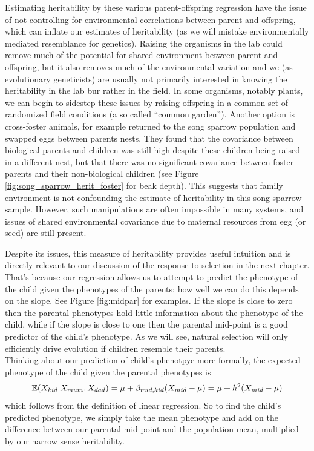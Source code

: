 Estimating heritability by these various parent-offspring regression have the issue of not controlling for
environmental correlations between parent and offspring, which can
inflate our estimates of heritability (as we will mistake
environmentally mediated resemblance for genetics). Raising the
organisms in the lab could remove much of the potential for shared
environment between parent and offspring, but it also removes much of the
environmental variation and we (as evolutionary geneticists) are usually not primarily interested in knowing
the heritability in the lab bur rather in the field. In some organisms,
notably plants, we can begin to sidestep these issues by raising offspring
in a common set of randomized field conditions (a so called ``common
garden''). Another option is cross-foster animals, for example
\citet{smith1980experimental} returned to the song sparrow population
and swapped eggs between parents nests. They found that the covariance
between biological parents and children was still high despite these
children being raised in a different nest, but that there was no significant
covariance between foster parents and their non-biological children
(see Figure \ref{fig:song_sparrow_herit_foster} for beak depth). This suggests that
family environment is not confounding the estimate of heritability in
this song sparrow sample. However, such manipulations are often
impossible in many systems, and issues of shared environmental
covariance due to maternal resources from egg (or seed) are still present. 

Despite its issues, this measure of heritability provides useful
intuition and is directly relevant to our discussion of the response to selection in
the next chapter. That's because our regression allows us to attempt to predict the phenotype of the
child given the phenotypes of the parents; how well we can do this depends on the
slope. See Figure \ref{fig:midpar} for examples. If the slope is close
to zero then the parental phenotypes hold little
information about the phenotype of the child, while if the slope is
close to one then the parental mid-point is a good predictor of the child's
phenotype. As we will see, natural selection will only efficiently
drive evolution if children resemble their parents.\\

Thinking about our prediction of child's phenotpye more formally, the expected phenotype of the child given the parental
phenotypes is
\begin{equation}
\mathbb{E}(X_{kid} | X_{mum},X_{dad}) = \mu +
\beta_{mid,kid}(X_{mid} - \mu) =\mu + h^2(X_{mid} - \mu)  \label{predict_kid}
\end{equation}
which follows from the definition of linear regression. So to find the
child's predicted phenotype, we simply take the mean phenotype and add on the difference between our parental mid-point and the population mean, multiplied by our
narrow sense heritability. \\


